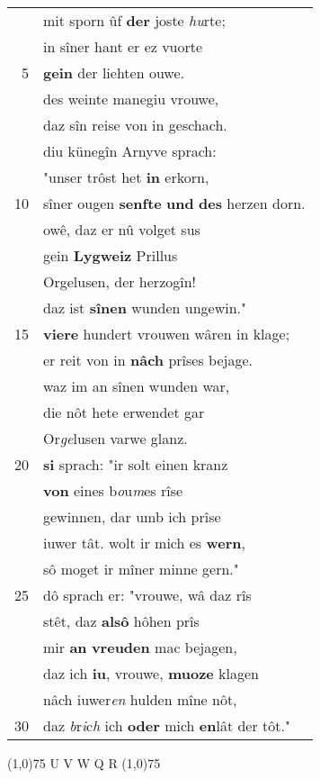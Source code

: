 \documentclass[8pt,a4paper,notitlepage]{article}
\begin{document}
\begin{table}[ht]
\begin{minipage}[t]{0.5\linewidth}
\begin{tabular}{rl}
 & mit sporn ûf \textbf{der} joste \textit{hu}rte;\\ 
 & in sîner hant er ez vuorte\\ 
5 & \textbf{gein} der liehten ouwe.\\ 
 & des weinte manegiu vrouwe,\\ 
 & daz sîn reise von in geschach.\\ 
 & diu künegîn Arnyve sprach:\\ 
 & "unser trôst het \textbf{in} erkorn,\\ 
10 & sîner ougen \textbf{senfte} \textbf{und} \textbf{des} herzen dorn.\\ 
 & owê, daz er nû volget sus\\ 
 & gein \textbf{Lygweiz} Prillus\\ 
 & Orgelusen, der herzogîn!\\ 
 & daz ist \textbf{sînen} wunden ungewin."\\ 
15 & \textbf{viere} hundert vrouwen wâren in klage;\\ 
 & er reit von in \textbf{nâch} prîses bejage.\\ 
 & waz im an sînen wunden war,\\ 
 & die nôt hete erwendet gar\\ 
 & Or\textit{ge}lusen varwe glanz.\\ 
20 & \textbf{si} sprach: "ir solt einen kranz\\ 
 & \textbf{von} eines b\textit{o}u\textit{m}es rîse\\ 
 & gewinnen, dar umb ich prîse\\ 
 & iuwer tât. wolt ir mich es \textbf{wern},\\ 
 & sô moget ir mîner minne gern."\\ 
25 & dô sprach er: "vrouwe, wâ daz rîs\\ 
 & stêt, daz \textbf{alsô} hôhen prîs\\ 
 & mir \textbf{an} \textbf{vreuden} mac bejagen,\\ 
 & daz ich \textbf{iu}, vrouwe, \textbf{muoze} klagen\\ 
 & nâch iuwer\textit{en} hulden mîne nôt,\\ 
30 & daz \textit{b}r\textit{i}c\textit{h} ich \textbf{oder} mich \textbf{en}lât der tôt."\\ 
\end{tabular}
\scriptsize
\line(1,0){75} \newline
U V W Q R \newline
\line(1,0){75} \newline

\end{minipage}
\end{table}
\end{document}

